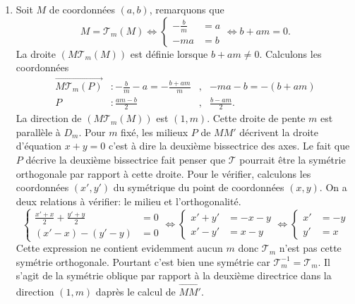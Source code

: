 \begin{enumerate}
 \item Soit $M$ de coordonnées $(a,b)$, remarquons que
\begin{displaymath}
 M = \mathcal{T}_m(M) \Leftrightarrow
 \left\lbrace
 \begin{align}
  -\frac{b}{m} &= a \\
  -ma &= b
 \end{align}
 \right. \Leftrightarrow b + am = 0.
\end{displaymath}
La droite $(M \mathcal{T}_m(M))$ est définie lorsque $b + am \neq 0$.\newline
Calculons les coordonnées
\begin{align*}
 \overrightarrow{M \mathcal{T}_m(P)} &: -\frac{b}{m} -a = -\frac{b+am}{m} &,&  -ma - b = - (b+am) \\
 P &: \frac{am - b}{2} &,& \frac{b-am}{2}.
\end{align*}
La direction de $(M \mathcal{T}_m(M))$ est $(1,m)$. Cette droite de pente $m$ est parallèle à $D_m$.\newline
Pour $m$ fixé, les milieux $P$ de $MM'$ décrivent la droite d'équation $x+y = 0$ c'est à dire la deuxième bissectrice des axes.\newline
Le fait que $P$ décrive la deuxième bissectrice fait penser que $\mathcal{T}$ pourrait être la symétrie orthogonale par  rapport à cette droite.\newline
Pour le vérifier, calculons les coordonnées $(x',y')$ du symétrique du point de coordonnées $(x,y)$. On a deux relations à vérifier: le milieu et l'orthogonalité.
\begin{displaymath}
 \left\lbrace
   \begin{aligned}
     \frac{x' + x}{2} + \frac{y' + y}{2} &= 0\\
     (x' - x) - (y' -y) &= 0
   \end{aligned}
 \right.  \Leftrightarrow
 \left\lbrace
   \begin{aligned}
     x' + y' &=  -x -y\\
     x' - y' &=  x - y
   \end{aligned}
 \right. \Leftrightarrow
 \left\lbrace
   \begin{aligned}
     x' &= -y \\ y' &= x
   \end{aligned}
 \right.
\end{displaymath}
Cette expression ne contient evidemment aucun $m$ donc $\mathcal{T}_m$ n'est pas cette symétrie orthogonale. Pourtant c'est bien une symétrie car $\mathcal{T}_m^{-1} = \mathcal{T}_m$. Il s'agit de la symétrie oblique par rapport à la deuxième directrice dans la direction $(1,m)$ daprès le calcul de $\overrightarrow{MM'}$.


\end{enumerate}
